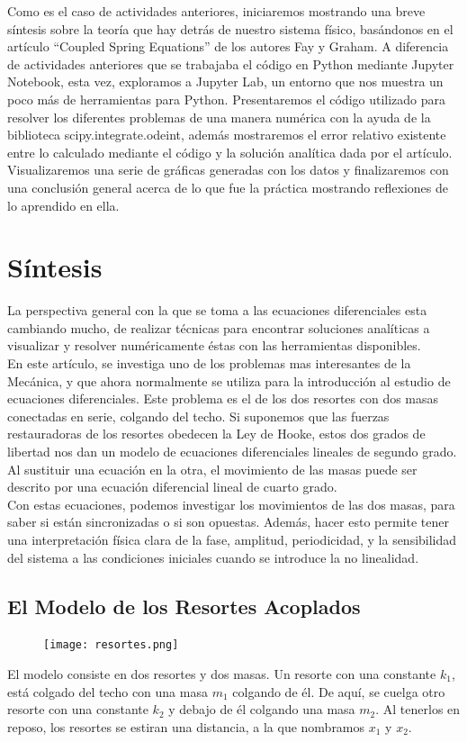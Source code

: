 \documentclass[12pt]{article}
\begin{document}
Como es el caso de actividades anteriores, iniciaremos mostrando una breve síntesis sobre la teoría que hay detrás de nuestro sistema físico, basándonos en el artículo “Coupled Spring Equations” de los autores Fay y Graham. A diferencia de actividades anteriores que se trabajaba el código en Python mediante Jupyter Notebook, esta vez, exploramos a Jupyter Lab, un entorno que nos muestra un poco más de herramientas para Python. Presentaremos el código utilizado para resolver los diferentes problemas de una manera numérica con la ayuda de la biblioteca scipy.integrate.odeint, además mostraremos el error relativo existente entre lo calculado mediante el código y la solución analítica dada por el artículo. Visualizaremos una serie de gráficas generadas con los datos y finalizaremos con una conclusión general acerca de lo que fue la práctica mostrando reflexiones de lo aprendido en ella.

\section*{Síntesis}
La perspectiva general con la que se toma a las ecuaciones diferenciales esta cambiando mucho, de realizar técnicas para encontrar soluciones analíticas a visualizar y resolver numéricamente éstas con las herramientas disponibles.\\

En este artículo, se investiga uno de los problemas mas interesantes de la Mecánica, y que ahora normalmente se utiliza para la introducción al estudio de ecuaciones diferenciales. Este problema es el de los dos resortes con dos masas conectadas en serie, colgando del techo. Si suponemos que las fuerzas restauradoras de los resortes obedecen la Ley de Hooke, estos dos grados de libertad nos dan un modelo de ecuaciones diferenciales lineales de segundo grado. Al sustituir una ecuación en la otra, el movimiento de las masas puede ser descrito por una ecuación diferencial lineal de cuarto grado.\\

Con estas ecuaciones, podemos investigar los movimientos de las dos masas, para saber si están sincronizadas o si son opuestas. Además, hacer esto permite tener una interpretación física clara de la fase, amplitud, periodicidad, y la sensibilidad del sistema a las condiciones iniciales cuando se introduce la no linealidad.

\subsection*{El Modelo de los Resortes Acoplados}
\begin{figure}
    \centering
    \texttt{[image: resortes.png]}
\end{figure}
El modelo consiste en dos resortes y dos masas. Un resorte con una constante $k_1$, está colgado del techo con una masa $m_1$ colgando de él.
De aquí, se cuelga otro resorte con una constante $k_2$ y debajo de él colgando una masa $m_2$. Al tenerlos en reposo, los resortes se estiran una distancia, a la que nombramos $x_1$ y $x_2$.
\end{document}
